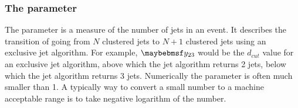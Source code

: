 


\subsubsection{The \y{} parameter}
\label{sec:pandoraYparameter}
The \y{} parameter is a measure of the number of jets in an event.  It describes the transition of  going from $N$ clustered jets to $N\!+\!1$ clustered jets using an exclusive jet algorithm. For example, $\y{23}$ would be the $d_{cut}$ value for an exclusive jet algorithm, above which the jet algorithm returns 2 jets, below which the jet algorithm returns 3 jets. Numerically the \y{} parameter is often much smaller than 1. A typically way to convert a small number to a machine acceptable range is to take  negative logarithm of the number.

